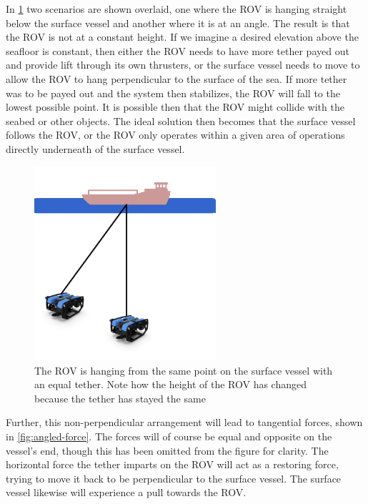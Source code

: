 \documentclass[class=article, crop=false]{standalone}
\begin{document}
In \cref{fig:angled} two scenarios are shown overlaid, one where the ROV is hanging straight below the surface vessel and another where it is at an angle. The result is that the ROV is not at a constant height. If we imagine a desired elevation above the seafloor is constant, then either the ROV needs to have more tether payed out and provide lift through its own thrusters, or the surface vessel needs to move to allow the ROV to hang perpendicular to the surface of the sea. If more tether was to be payed out and the system then stabilizes, the ROV will fall to the lowest possible point. It is possible then that the ROV might collide with the seabed or other objects. The ideal solution then becomes that the surface vessel follows the ROV, or the ROV only operates within a given area of operations directly underneath of the surface vessel. 

\begin{figure}
	\centering
	\includegraphics[width=0.6\textwidth]{angled}
	\caption{The ROV is hanging from the same point on the surface vessel with an equal tether. Note how the height of the ROV has changed because the tether has stayed the same}
	\label{fig:angled}
\end{figure}

Further, this non-perpendicular arrangement will lead to tangential forces, shown in \cref{fig:angled-force}. The forces will of course be equal and opposite on the vessel's end, though this has been omitted from the figure for clarity. The horizontal force the tether imparts on the ROV will act as a restoring force, trying to move it back to be perpendicular to the surface vessel. The surface vessel likewise will experience a pull towards the ROV. 
\end{document}

